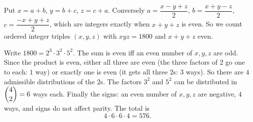 Put $x=a+b$, $y=b+c$, $z=c+a$. Conversely $a=\dfrac{x-y+z}{2}$, $b=\dfrac{x+y-z}{2}$, $c=\dfrac{-x+y+z}{2}$, which are integers exactly when $x+y+z$ is even. So we count ordered integer triples $(x,y,z)$ with $xyz=1800$ and $x+y+z$ even.

Write $1800=2^3\cdot3^2\cdot5^2$. The sum is even iff an even number of $x,y,z$ are odd. Since the product is even, either all three are even (the three factors of $2$ go one to each: $1$ way) or exactly one is even (it gets all three $2$s: $3$ ways). So there are $4$ admissible distributions of the $2$s. The factors $3^2$ and $5^2$ can be distributed in $\dbinom42=6$ ways each. Finally the signs: an even number of $x,y,z$ are negative, $4$ ways, and signs do not affect parity. The total is
\[
4\cdot6\cdot6\cdot4=\boxed{576}.
\]
